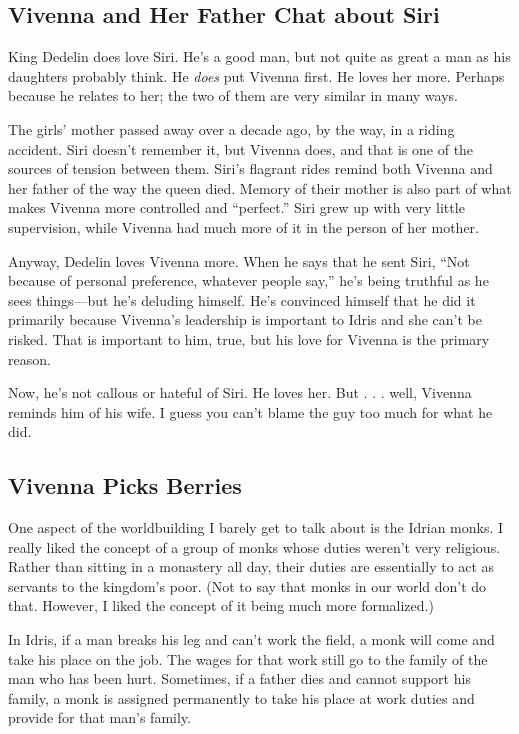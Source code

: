\subsection*{Vivenna and Her Father Chat about Siri}

King Dedelin does love Siri. He’s a good man, but not quite as great a man as his daughters probably think. He \textit{does} put Vivenna first. He loves her more. Perhaps because he relates to her; the two of them are very similar in many ways.

The girls’ mother passed away over a decade ago, by the way, in a riding accident. Siri doesn’t remember it, but Vivenna does, and that is one of the sources of tension between them. Siri’s flagrant rides remind both Vivenna and her father of the way the queen died. Memory of their mother is also part of what makes Vivenna more controlled and “perfect.” Siri grew up with very little supervision, while Vivenna had much more of it in the person of her mother.

Anyway, Dedelin loves Vivenna more. When he says that he sent Siri, “Not because of personal preference, whatever people say,” he’s being truthful as he sees things—but he’s deluding himself. He’s convinced himself that he did it primarily because Vivenna’s leadership is important to Idris and she can’t be risked. That is important to him, true, but his love for Vivenna is the primary reason.

Now, he’s not callous or hateful of Siri. He loves her. But . . . well, Vivenna reminds him of his wife. I guess you can’t blame the guy too much for what he did.

\subsection*{Vivenna Picks Berries}

One aspect of the worldbuilding I barely get to talk about is the Idrian monks. I really liked the concept of a group of monks whose duties weren’t very religious. Rather than sitting in a monastery all day, their duties are essentially to act as servants to the kingdom’s poor. (Not to say that monks in our world don’t do that. However, I liked the concept of it being much more formalized.)

In Idris, if a man breaks his leg and can’t work the field, a monk will come and take his place on the job. The wages for that work still go to the family of the man who has been hurt. Sometimes, if a father dies and cannot support his family, a monk is assigned permanently to take his place at work duties and provide for that man’s family.

